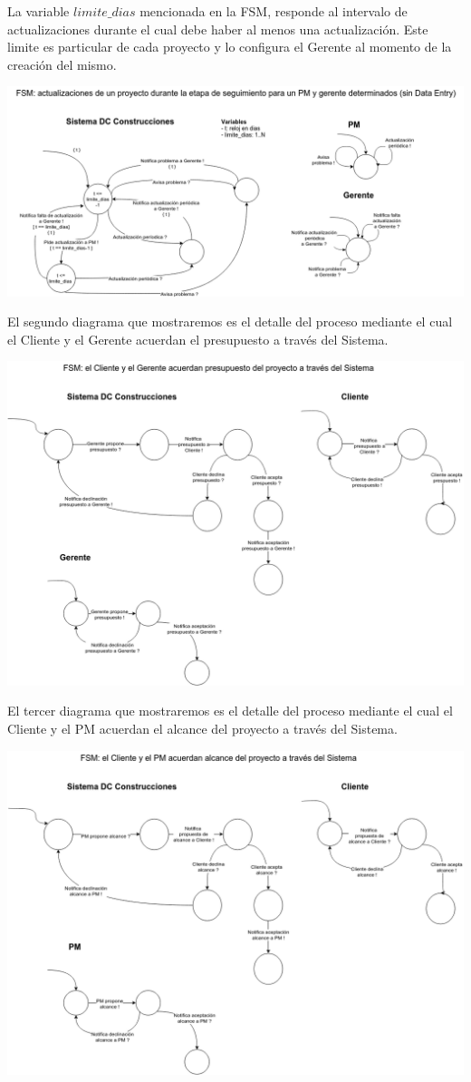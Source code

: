 La variable $limite\_dias$ mencionada en la FSM, responde al intervalo de actualizaciones durante el cual debe haber al menos una actualización. Este limite es particular de cada proyecto y lo configura el Gerente al momento de la creación del mismo.

\begin{center}
\includegraphics[scale=0.5, angle=90]{imagenes/FSM1.png}
\end{center}

\newpage
El segundo diagrama que mostraremos es el detalle del proceso mediante el cual el Cliente y el Gerente acuerdan el presupuesto a través del Sistema.

\begin{center}
\includegraphics[scale=0.5, angle=90]{imagenes/FSM2.png}
\end{center}

\newpage
El tercer diagrama que mostraremos es el detalle del proceso mediante el cual el Cliente y el PM acuerdan el alcance del proyecto a través del Sistema.

\begin{center}
\includegraphics[scale=0.5, angle=90]{imagenes/FSM3.png}
\end{center}
